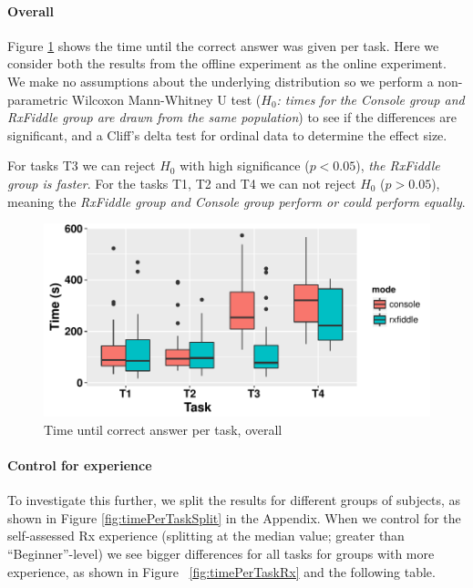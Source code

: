 \paragraph{Overall} Figure%
\ref{fig:timePerTask} shows the time until the correct answer was given
per task.  Here we consider both the results from the offline experiment
as the online experiment.  We make no assumptions about the underlying
distribution so we perform a non-parametric Wilcoxon Mann-Whitney U test
(\textit{$ H_0 $:  times for the Console group and RxFiddle group are
drawn from the same population}) to see if the differences are
significant, and a Cliff's delta test for ordinal data to determine the
effect size.

\begin{centering}
    
\end{centering}

For tasks T3 we can reject $ H_0 $ with high significance ($ p < 0.05 $),
\emph{the RxFiddle group is faster}.  For the tasks T1, T2 and T4 we can
not reject $ H_0 $ ($ p > 0.05 $), meaning the \emph{RxFiddle group and
Console group perform or could perform equally}.

\begin{figure}[t]
    \includegraphics[width=\columnwidth]{images/timePerTask.pdf}
    \caption{Time until correct answer per task, overall}%
    \label{fig:timePerTask}
\end{figure}

\paragraph{Control for experience} To investigate this further, we split
the results for different groups of subjects, as shown in Figure%
\ref{fig:timePerTaskSplit} in the Appendix.  When we control for the
self-assessed Rx experience (splitting at the median value; greater than
``Beginner''-level) we see bigger differences for all tasks for groups
with more experience, as shown in Figure~%
\ref{fig:timePerTaskRx} and the following table.

